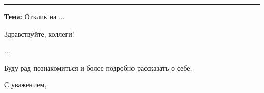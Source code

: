 \documentclass[letterpaper,11pt]{article}
\begin{document}

\vspace{0.5cm} %
\hrule %
\vspace{0.5cm}

\textbf{Тема:} Отклик на ...

Здравствуйте, коллеги!

...

Буду рад познакомиться и более подробно рассказать о себе.

С уважением,\\
\fullName
\end{document}
